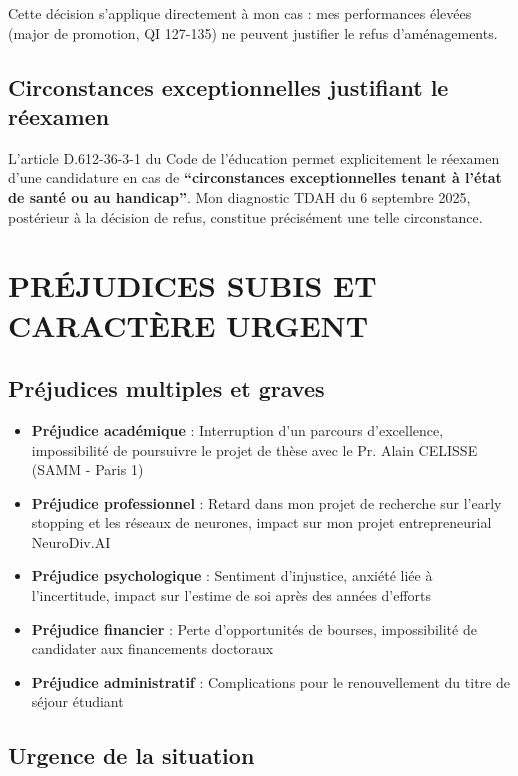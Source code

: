 \documentclass[12pt,french,a4paper]{article}
\begin{document}
Cette décision s'applique directement à mon cas : mes performances élevées (major de promotion, QI 127-135) ne peuvent justifier le refus d'aménagements.

\subsection{Circonstances exceptionnelles justifiant le réexamen}

L'article D.612-36-3-1 du Code de l'éducation permet explicitement le réexamen d'une candidature en cas de \textbf{``circonstances exceptionnelles tenant à l'état de santé ou au handicap''}. Mon diagnostic TDAH du 6 septembre 2025, postérieur à la décision de refus, constitue précisément une telle circonstance.

\section{PRÉJUDICES SUBIS ET CARACTÈRE URGENT}

\subsection{Préjudices multiples et graves}

\begin{itemize}
\item \textbf{Préjudice académique} : Interruption d'un parcours d'excellence, impossibilité de poursuivre le projet de thèse avec le Pr. Alain CELISSE (SAMM - Paris 1)
\item \textbf{Préjudice professionnel} : Retard dans mon projet de recherche sur l'early stopping et les réseaux de neurones, impact sur mon projet entrepreneurial NeuroDiv.AI
\item \textbf{Préjudice psychologique} : Sentiment d'injustice, anxiété liée à l'incertitude, impact sur l'estime de soi après des années d'efforts
\item \textbf{Préjudice financier} : Perte d'opportunités de bourses, impossibilité de candidater aux financements doctoraux
\item \textbf{Préjudice administratif} : Complications pour le renouvellement du titre de séjour étudiant
\end{itemize}

\subsection{Urgence de la situation}
\end{document}
